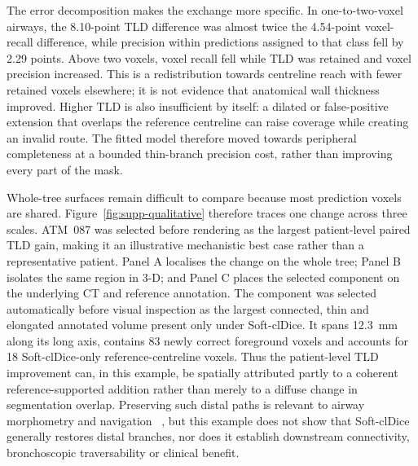 \ifshowcurrentcontrol
\begin{currentcontrolroute}
The error decomposition makes the exchange more specific. In one-to-two-voxel airways, the
8.10-point TLD difference was almost twice the 4.54-point voxel-recall difference, while precision
within predictions assigned to that class fell by 2.29 points. Above two voxels, voxel recall
fell while TLD was retained and voxel precision increased. This is a redistribution towards
centreline reach with fewer retained voxels elsewhere; it is not evidence that anatomical wall
thickness improved. Higher TLD is also insufficient by itself: a dilated or false-positive
extension that overlaps the reference centreline can raise coverage while creating an invalid
route. The fitted model therefore moved towards peripheral completeness at a bounded thin-branch
precision cost, rather than improving every part of the mask.

Whole-tree surfaces remain difficult to compare because most prediction voxels are shared.
Figure~\ref{fig:supp-qualitative} therefore traces one change across three scales. ATM~087 was
selected before rendering as the largest patient-level paired TLD gain, making it an illustrative
mechanistic best case rather than a representative patient. Panel A localises the change on the
whole tree; Panel B isolates the same region in 3-D; and Panel C places the selected component on
the underlying CT and reference annotation. The component was selected automatically before
visual inspection as the largest connected, thin and elongated annotated volume present only
under Soft-clDice. It spans 12.3~mm along its long axis, contains 83 newly correct foreground
voxels and accounts for 18 Soft-clDice-only reference-centreline voxels. Thus the patient-level
TLD improvement can, in this example, be spatially attributed partly to a coherent
reference-supported addition rather than merely to a diffuse change in segmentation overlap.
Preserving such distal paths is relevant to airway morphometry and navigation
~\cite{Wang2023qct,Dhillon2017PeripheralBronchoscopy,HammadAltaq2023robotic}, but this example does
not show that Soft-clDice generally restores distal branches, nor does it establish downstream
connectivity, bronchoscopic traversability or clinical benefit.
\end{currentcontrolroute}

